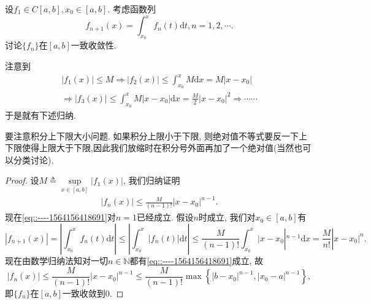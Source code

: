 \documentclass[../../main.tex]{subfiles}%
\begin{document}
\begin{example}
设$f_1\in C[a,b],x_0\in[a,b]$. 考虑函数列
$$
f_{n+1}(x)=\int_{x_0}^{x}f_n(t)\mathrm{d}t,n=1,2,\cdots.
$$
讨论$\{f_n\}$在$[a,b]$一致收敛性.
\end{example}
\begin{note}
注意到
\begin{gather*}
\left| f_1\left( x \right) \right|\leqslant M\Rightarrow \left| f_2\left( x \right) \right|\leqslant \int_{x_0}^x{M\mathrm{d}x}=M\left| x-x_0 \right|
\\
\Rightarrow \left| f_3\left( x \right) \right|\leqslant \int_{x_0}^x{M\left| x-x_0 \right|\mathrm{d}x}=\frac{M}{2}\left| x-x_0 \right|^2\Rightarrow \cdots \cdots 
\end{gather*}
于是就有下述归纳.
\end{note}
\begin{remark}
要注意积分上下限大小问题. 如果积分上限小于下限, 则绝对值不等式要反一下上下限使得上限大于下限,因此我们放缩时在积分号外面再加了一个绝对值(当然也可以分类讨论).
\end{remark}
\begin{proof}

设$M\triangleq\sup\limits_{x\in[a,b]}|f_1(x)|$, 我们归纳证明
\begin{align}
|f_n(x)|\leqslant\frac{M}{(n-1)!}|x-x_0|^{n-1}\label{eq::----1564156418691}.
\end{align}
现在\eqref{eq::----1564156418691}对$n=1$已经成立. 假设$n$时成立, 我们对$x_0\in [a,b]$有
$$
|f_{n+1}(x)|=\left| \int_{x_0}^x{f_n(t)\mathrm{d}t} \right|\leqslant \left| \int_{x_0}^x{\left| f_n(t) \right|\mathrm{d}t} \right|\leqslant \frac{M}{(n-1)!}\int_{x_0}^x{|x}-x_0|^{n-1}\mathrm{d}x=\frac{M}{n!}|x-x_0|^n.
$$
现在由数学归纳法知对一切$n\in\mathbb{N}$都有\eqref{eq::----1564156418691}成立, 故
$$
|f_n(x)|\leqslant\frac{M}{(n-1)!}|x-x_0|^{n-1}\leqslant\frac{M}{(n-1)!}\max\left\{|b-x_0|^{n-1},|x_0-a|^{n-1}\right\},
$$
即$\{f_n\}$在$[a,b]$一致收敛到$0$.

\end{proof}
\end{document}
